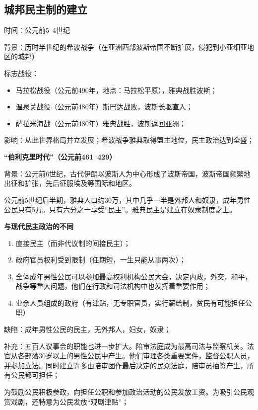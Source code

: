 \subsection{城邦民主制的建立}

时间：公元前5~4世纪

背景：历时半世纪的希波战争（在亚洲西部波斯帝国不断扩展，侵犯到小亚细亚地区的城邦）

标志战役：
\begin{itemize}
    \item 马拉松战役（公元前490年，地点：马拉松平原），雅典战胜波斯；
    \item 温泉关战役（公元前480年）斯巴达战败，波斯长驱直入；
    \item 萨拉米海战（公元前480年）雅典战胜，波斯返回亚洲；
\end{itemize}

影响：从此世界格局并立发展；希波战争雅典取得盟主地位，民主政治达到全盛；

\textbf{“伯利克里时代”（公元前461~429）}

背景：公元前6世纪，古代伊朗以波斯人为中心形成了波斯帝国，波斯帝国频繁地出征和扩张，先后征服埃及等国际和地区。

公元前5世纪后半期，雅典人口约30万，其中几乎一半是外邦人和奴隶，成年男性公民只有5万。只有六分之一享受“民主”。雅典民主是建立在奴隶制度之上。

\textbf{与现代民主政治的不同}
\begin{enumerate}
    \item 直接民主（而非代议制的间接民主）；
    \item 政府官员权利受到限制（任期短，一生只能从事两次）；
    \item 全体成年男性公民可以参加最高权利机构公民大会，决定内政，外交，和平，战争等重大问题，他们在行政和司法机构中也发挥着重要作用；
    \item 业余人员组成的政府（有津贴，无专职官员，实行薪给制，贫民有可能担任公职）
\end{enumerate}

缺陷：成年男性公民的民主，无外邦人，妇女，奴隶；

补充：五百人议事会的职能也进一步扩大。陪审法庭成为最高司法与监察机关。法官从各部落30岁以上的男性公民中产生。他们审理各类重要案件，监督公职人员，并参加立法。同时建立许多由陪审团作最后决定的民众法庭，陪审员抽签产生，所有公民都可担任；

为鼓励公民积极参政，向担任公职和参加政治活动的公民发放工资。为吸引公民观赏戏剧，还特意为公民发放“观剧津贴”；

